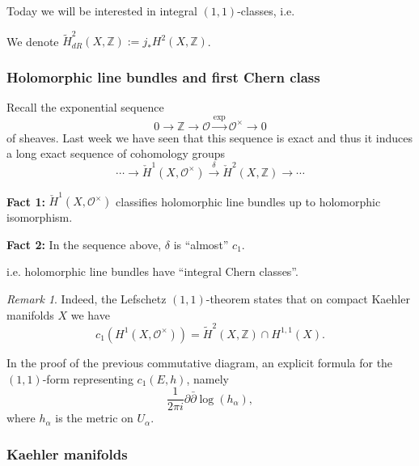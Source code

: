 \documentclass[12pt]{article}
\theoremstyle{darkgreentheorem}
\theoremstyle{darkbluedefinition}
\theoremstyle{darkredexample}
\theoremstyle{remark}
\newtheorem{rem}[thm]{Remark}
\newcommand{\Z}{\mathbb{Z}}
\newcommand{\R}{\mathbb{R}}
\newcommand{\1}{\mathbbm{1}}
\newcommand{\C}{\mathbb{C}}
\renewcommand{\O}{\mathcal{O}}
\begin{document}
Today we will be interested in integral $(1,1)$-classes, i.e.
\begin{center}
\end{center}
We denote $\tilde{H}_{dR}^{2}(X,\Z):= j_{*}H^{2}(X,\Z)$.

\subsubsection{Holomorphic line bundles and first Chern class}

Recall the exponential sequence
\[ 0\to \Z\to \O\xrightarrow{\exp}\O^{\times}\to 0\]
of sheaves.
Last week we have seen that this sequence is exact and thus it induces a long exact sequence of cohomology groups
\[ \cdots \to \check{H}^{1}(X,\O^{\times})\xrightarrow{\delta} \check{H}^{2}(X,\Z)\to \cdots \]

\textbf{Fact 1:} $\check{H}^{1}(X,\O^{\times})$ classifies holomorphic line bundles up to holomorphic isomorphism.

\textbf{Fact 2:} In the sequence above, $\delta$ is ``almost'' $c_{1}$.
\begin{center}
\end{center}
i.e. holomorphic line bundles have ``integral Chern classes''.

\begin{rem}
    Indeed, the Lefschetz $(1,1)$-theorem states that on compact Kaehler manifolds $X$ we have
    \[ c_{1}(H^{1}(X,\O^{\times}))=\tilde{H}^{2}(X,\Z)\cap H^{1,1}(X). \]
\end{rem}

In the proof of the previous commutative diagram, an explicit formula for the $(1,1)$-form representing $c_{1}(E,h)$, namely
\[ \frac{1}{2\pi i}\partial \bar{\partial} \log(h_{\alpha}),\]
where $h_{\alpha}$ is the metric on $U_{\alpha}$.

\subsubsection{Kaehler manifolds}
\end{document}
